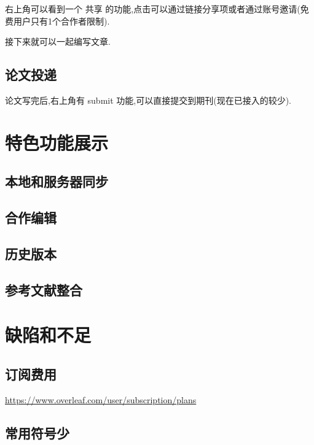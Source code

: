 \documentclass[]{ctexbook}
\begin{document}
右上角可以看到一个 共享 的功能,点击可以通过链接分享项或者通过账号邀请(免费用户只有1个合作者限制).

接下来就可以一起编写文章.

\hypertarget{section-6}{%
\section{论文投递}\label{section-6}}

论文写完后,右上角有 submit 功能,可以直接提交到期刊(现在已接入的较少).

\hypertarget{section-7}{%
\chapter{特色功能展示}\label{section-7}}

\hypertarget{section-8}{%
\section{本地和服务器同步}\label{section-8}}

\hypertarget{section-9}{%
\section{合作编辑}\label{section-9}}

\hypertarget{section-10}{%
\section{历史版本}\label{section-10}}

\hypertarget{section-11}{%
\section{参考文献整合}\label{section-11}}

\hypertarget{section-12}{%
\chapter{缺陷和不足}\label{section-12}}

\hypertarget{section-13}{%
\section{订阅费用}\label{section-13}}

\url{https://www.overleaf.com/user/subscription/plans}

\hypertarget{section-14}{%
\section{常用符号少}\label{section-14}}
\end{document}

